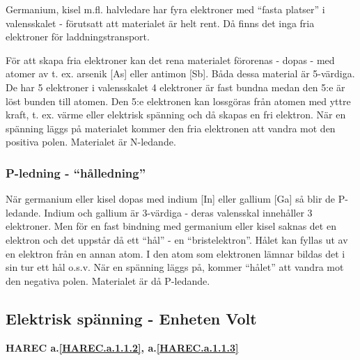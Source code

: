 Germanium, kisel m.fl. halvledare har fyra elektroner med ``fasta platser'' i
valensskalet - förutsatt att materialet är helt rent. Då finns det inga fria
elektroner för laddningstransport.

För att skapa fria elektroner kan det rena materialet förorenas - dopas - med
atomer av t. ex. arsenik [As] eller antimon [Sb]. Båda dessa material är
5-värdiga. De har 5 elektroner i valensskalet 4 elektroner är fast bundna medan
den 5:e är löst bunden till atomen. Den 5:e elektronen kan lossgöras från
atomen med yttre kraft, t. ex. värme eller elektrisk spänning och då skapas en
fri elektron. När en spänning läggs på materialet kommer den fria elektronen
att vandra mot den positiva polen. Materialet är N-ledande.

\subsubsection{P-ledning - ``hålledning''}
När germanium eller kisel dopas med indium [In] eller gallium [Ga] så blir de
P-ledande. Indium och gallium är 3-värdiga - deras valensskal innehåller 3
elektroner. Men för en fast bindning med germanium eller kisel saknas det en
elektron och det uppstår då ett ``hål'' - en ``bristelektron''. Hålet kan fyllas ut
av en elektron från en annan atom. I den atom som elektronen lämnar bildas det
i sin tur ett hål o.s.v. När en spänning läggs på, kommer ``hålet'' att vandra
mot den negativa polen. Materialet är då P-ledande.

\subsection{Elektrisk spänning - Enheten Volt}
\textbf{HAREC a.\ref{HAREC.a.1.1.2}\label{myHAREC.a.1.1.2b}, a.\ref{HAREC.a.1.1.3}\label{myHAREC.a.1.1.3b}}

